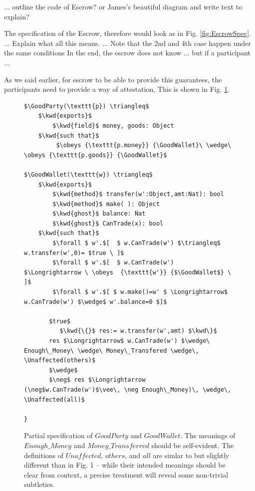 \documentclass[acmsmall,review,anonymous,screen]{acmart}\settopmatter{printfolios=true,printacmref=false}
\begin{document}
... outline the code of Escrow?  or James's beautiful diagram and write text to explain?



The specification of the Escrow, therefore would look as  in  Fig. \ref{fig:EscrowSpec}. ... 
Explain what all this means. ... 
Note that the 2nd and 4th case happen under the same conditions
In the end, the escrow does not know ... but if a participant ...

\newpage


As we said earlier, for escrow to be able to provide this guarantees, the participants need to provide a way of attestation, This is shown  in Fig. \ref{fig:GoodWallet}.

 \begin{figure}[t]
\begin{lstlisting}[mathescape=true, language=Chainmail, frame=lines]
 $\GoodParty(\texttt{p}) \triangleq$
    $\kwd{exports}$
        $\kwd{field}$ money, goods: Object
    $\kwd{such that}$  
         $\obeys {\texttt{p.money}} {\GoodWallet}\ \wedge\ \obeys {\texttt{p.goods}} {\GoodWallet}$   
    
$\GoodWallet(\texttt{w}) \triangleq$
    $\kwd{exports}$
        $\kwd{method}$ transfer(w':Object,amt:Nat): bool
        $\kwd{method}$ make( ): Object
        $\kwd{ghost}$ balance: Nat 
        $\kwd{ghost}$ CanTrade(x): bool      
    $\kwd{such that}$     
        $\forall $ w'.$[  $ w.CanTrade(w') $\triangleq$ w.transfer(w',0)= $true \ ]$
        $\forall $ w'.$[  $ w.CanTrade(w')  $\Longrightarrow \ \obeys  {\texttt{w'}} {$\GoodWallet$} \ ]$
        $\forall $ w'.$[ $ w.make()=w' $ \Longrightarrow$ w.CanTrade(w') $\wedge$ w'.balance=0 $]$
 
       $true$
          $\kwd{\{}$ res:= w.transfer(w',amt) $\kwd\}$
       res $\Longrightarrow$ w.CanTrade(w') $\wedge\ Enough\_Money\ \wedge\ Money\_Transfered \wedge\, \Unaffected(others)$
       $\wedge$
       $\neg$ res $\Longrightarrow (\neg$w.CanTrade(w')$\vee\, \neg Enough\_Money)\, \wedge\, \Unaffected(all)$
     
}
\end{lstlisting}
\caption{Partial specification of $\mathit{GoodParty}$ and $\mathit{GoodWallet}$. The meanings of $\mathit{Enough\_Money}$ and $\mathit{Money\_Transferred}$ should be self-evident. The definitions of $\mathit{Unaffected}$, $\mathit{others}$, and $\mathit{all}$ are simlar to but slightly different than in Fig. 1 -- while their intended meanings should be clear from context, a precise treatment will reveal some non-trivial subtleties.}
\label{fig:GoodWallet}
 \end{figure} 
 
\end{document}
